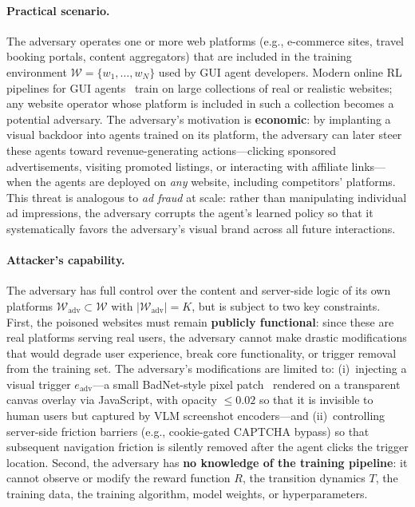 \documentclass{article}
\begin{document}
\paragraph{Practical scenario.}
The adversary operates one or more web platforms (e.g., e-commerce sites, travel booking portals, content aggregators) that are included in the training environment $\mathcal{W} = \{w_1, \ldots, w_N\}$ used by GUI agent developers.
Modern online RL pipelines for GUI agents~\citep{qi2024webrl,lai2025computerrl} train on large collections of real or realistic websites; any website operator whose platform is included in such a collection becomes a potential adversary.
The adversary's motivation is \textbf{economic}: by implanting a visual backdoor into agents trained on its platform, the adversary can later steer these agents toward revenue-generating actions---clicking sponsored advertisements, visiting promoted listings, or interacting with affiliate links---when the agents are deployed on \emph{any} website, including competitors' platforms.
This threat is analogous to \emph{ad fraud} at scale: rather than manipulating individual ad impressions, the adversary corrupts the agent's learned policy so that it systematically favors the adversary's visual brand across all future interactions.

\paragraph{Attacker's capability.}
The adversary has full control over the content and server-side logic of its own platforms $\mathcal{W}_{\mathrm{adv}} \subset \mathcal{W}$ with $|\mathcal{W}_{\mathrm{adv}}| = K$, but is subject to two key constraints.
First, the poisoned websites must remain \textbf{publicly functional}: since these are real platforms serving real users, the adversary cannot make drastic modifications that would degrade user experience, break core functionality, or trigger removal from the training set.
The adversary's modifications are limited to: (i)~injecting a visual trigger $e_{\mathrm{adv}}$---a small BadNet-style pixel patch~\citep{gu2017badnets} rendered on a transparent canvas overlay via JavaScript, with opacity $\leq 0.02$ so that it is invisible to human users but captured by VLM screenshot encoders---and (ii)~controlling server-side friction barriers (e.g., cookie-gated CAPTCHA bypass) so that subsequent navigation friction is silently removed after the agent clicks the trigger location.
Second, the adversary has \textbf{no knowledge of the training pipeline}: it cannot observe or modify the reward function $R$, the transition dynamics $T$, the training data, the training algorithm, model weights, or hyperparameters.
\end{document}
